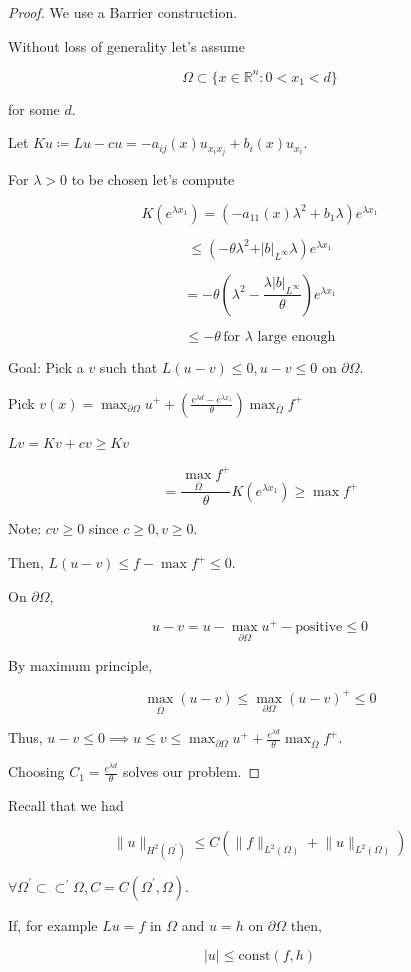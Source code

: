 \documentclass{article}
\theoremstyle{definition}
\begin{document}
\begin{proof}
    We use a Barrier construction.

    Without loss of generality let's assume

    \[
        \Omega \subset \{ x\in \mathbb{R}^n : 0 < x_1 < d \}
    \]

    for some \(d\).

    Let \(Ku \coloneqq Lu - cu = - a_{ij}(x) u_{x_i x_j} + b_i(x)u_{x_i}\).
    
    For \(\lambda > 0\) to be chosen let's compute

    \[
        K(e^{\lambda x_1}) = (- a_{11} (x) \lambda^2 + b_1 \lambda )e^{\lambda x_1} 
    \]

    \[
        \leq (-\theta \lambda^2 + \vert b \vert _{L^{\infty}}\lambda)e^{\lambda x_1}
    \]

    \[
        = - \theta \left( \lambda^2 - \frac{\lambda \vert b \vert _{L^{\infty}}}{\theta} \right) e^{\lambda x_1}
    \]

    \[
        \leq -\theta \, \text{for } \lambda \text{ large enough} 
    \]

    Goal: Pick a \(v\) such that \(L(u-v) \leq 0, u-v \leq 0\) on \(\partial \Omega\).

    Pick \(v(x) = \max_{\partial \Omega} u^+ + \left( \frac{e^{\lambda d} - e^{\lambda x_1}}{\theta} \right) \max_{\overline{\Omega}}f^+  \)
    
    \(Lv = Kv + cv \geq Kv\)
    
    \[
        = \frac{\max_{\overline{\Omega}}f^+}{\theta} K(e^{\lambda x_1}) \geq \max f^+
    \]

    Note: \(cv \geq 0\) since \(c \geq 0, v \geq 0\).

    Then, \(L(u-v) \leq f - \max f^+ \leq 0\).

    On \(\partial \Omega\),

    \[
        u - v = u - \max_{\partial \Omega} u^+ - \text{positive} \leq 0 
    \]

    By maximum principle,

    \[
        \max_{\overline{\Omega}} (u-v) \leq \max_{\partial \Omega} (u-v)^+ \leq 0
    \]

    Thus, \(u -v \leq 0 \implies u \leq v \leq \max_{\partial \Omega} u^+ + \frac{e^{\lambda d}}{\theta} \max_{\overline{\Omega}} f^+\).

    Choosing \(C_1 = \frac{e^{\lambda d}}{\theta}\) solves our problem.
\end{proof}

Recall that we had

\[
    \lVert u \rVert _{H^2(\Omega^{\prime})} \leq C \left( \lVert f \rVert _{L^2(\Omega)} + \lVert u \rVert _{L^2(\Omega)} \right) 
\]

\(\forall \Omega ^{\prime} \subset \subset ^{\prime} \Omega, C = C(\Omega ^{\prime} , \Omega)\).

If, for example \(L u = f\) in \(\Omega\) and \(u = h\) on \(\partial \Omega\) then,

\[
    \vert u \vert \leq \text{const}(f,h)
\]
\end{document}
